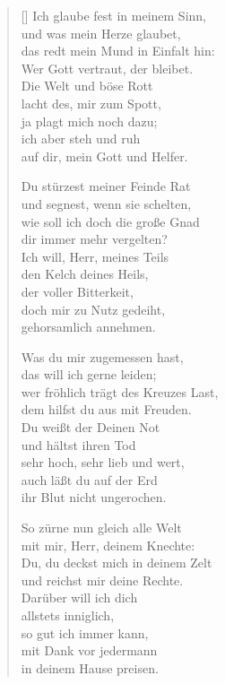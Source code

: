 \begin{multicols}{2}
\begin{verse}[\versewidth]
 Ich glaube fest in meinem Sinn,\\
und was mein Herze glaubet,\\
das redt mein Mund in Einfalt hin:\\
Wer Gott vertraut, der bleibet.\\
Die Welt und böse Rott\\
lacht des, mir zum Spott,\\
ja plagt mich noch dazu;\\
ich aber steh und ruh\\
auf dir, mein Gott und Helfer.

 Du stürzest meiner Feinde Rat\\
und segnest, wenn sie schelten,\\
wie soll ich doch die große Gnad\\
dir immer mehr vergelten?\\
Ich will, Herr, meines Teils\\
den Kelch deines Heils,\\
der voller Bitterkeit,\\
doch mir zu Nutz gedeiht,\\
gehorsamlich annehmen.

 Was du mir zugemessen hast,\\
das will ich gerne leiden;\\
wer fröhlich trägt des Kreuzes Last,\\
dem hilfst du aus mit Freuden.\\
Du weißt der Deinen Not\\
und hältst ihren Tod\\
sehr hoch, sehr lieb und wert,\\
auch läßt du auf der Erd\\
ihr Blut nicht ungerochen.

 So zürne nun gleich alle Welt\\
mit mir, Herr, deinem Knechte:\\
Du, du deckst mich in deinem Zelt\\
und reichst mir deine Rechte.\\
Darüber will ich dich\\
allstets inniglich,\\
so gut ich immer kann,\\
mit Dank vor jedermann\\
in deinem Hause preisen.

\end{verse}
\end{multicols}
